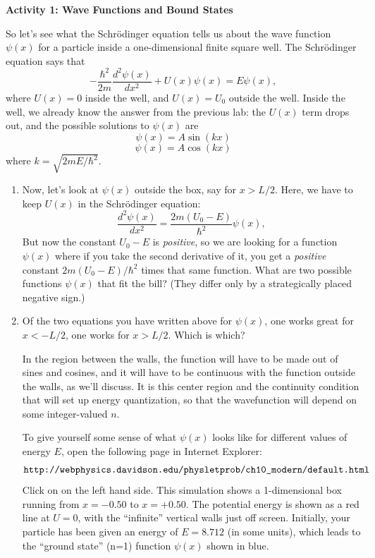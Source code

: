 \bigskip

\textbf{Activity 1: Wave Functions and Bound States}

So let's see what the Schr\"odinger equation tells us about the wave function $\psi(x)$ for a particle inside a one-dimensional finite square well. The Schr\"odinger equation says that
$$-\frac{\hbar^2}{2m} \frac{d^2\psi(x)}{dx^2} + U(x)\psi(x) = E\psi(x),$$
where $U(x) = 0$ inside the well, and $U(x) = U_0$ outside the well. Inside the well, we already know
the answer from the previous lab: the $U(x)$ term drops out, and the possible solutions to $\psi(x)$ are
$$\psi(x)=A\sin(kx)$$
$$\psi(x)=A\cos(kx)$$
where $k=\sqrt{2mE/\hbar^2}$.

\begin{enumerate}[wide]
\item Now, let's look at $\psi(x)$ outside the box, say for $x > L/2$.  Here, we have to keep $U(x)$ in the Schr\"odinger equation:
$$\frac{d^2\psi(x)}{dx^2} = \frac{2m(U_0 - E)}{\hbar^2}\psi(x),$$
But now the constant $U_0 - E$ is \textit{positive}, so we are looking for a function $\psi(x)$ where if you take the second derivative of it, you get a \textit{positive} constant $2m(U_0 - E) / \hbar^2$ times that same function. What are two possible functions $\psi(x)$ that fit the bill?  (They differ only by a strategically placed negative sign.) 
\answerspace{0.5in}

\item Of the two equations you have written above for $\psi(x)$, one works great for $x < -L/2$, one works for $x > L/2$. Which is which?
\answerspace{0.5in}

\pagebreak[2]

In the region between the walls, the function will have to be made out of sines and cosines, and it will have to be continuous with the function outside the walls, as we'll discuss.  It is this center region and the continuity condition that will set up energy quantization, so that the wavefunction will depend on some integer-valued $n$.

To give yourself some sense of what $\psi(x)$ looks like for different values of energy $E$, open the following page in Internet Explorer:
$$\verb!http://webphysics.davidson.edu/physletprob/ch10_modern/default.html!$$
Click on  on the left hand side. This simulation shows a 1-dimensional box running from $x =-0.50$ to $x = +0.50$. The potential energy is shown as a red line at $U = 0$, with the ``infinite'' vertical walls just off screen. Initially, your particle has been given an energy of $E = 8.712$ (in some units), which leads to the ``ground state'' (n=1) function $\psi(x)$ shown in blue.


\end{enumerate}
